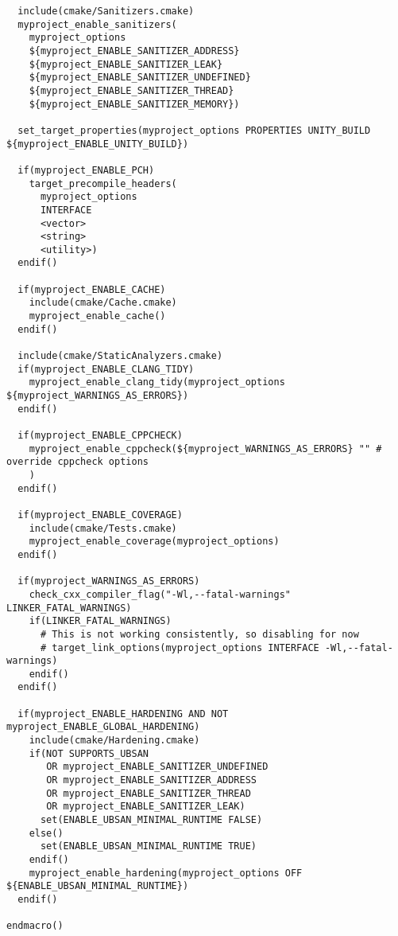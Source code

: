 \documentclass[openany]{report}
\begin{document}
\begin{verbatim}
  include(cmake/Sanitizers.cmake)
  myproject_enable_sanitizers(
    myproject_options
    ${myproject_ENABLE_SANITIZER_ADDRESS}
    ${myproject_ENABLE_SANITIZER_LEAK}
    ${myproject_ENABLE_SANITIZER_UNDEFINED}
    ${myproject_ENABLE_SANITIZER_THREAD}
    ${myproject_ENABLE_SANITIZER_MEMORY})

  set_target_properties(myproject_options PROPERTIES UNITY_BUILD ${myproject_ENABLE_UNITY_BUILD})

  if(myproject_ENABLE_PCH)
    target_precompile_headers(
      myproject_options
      INTERFACE
      <vector>
      <string>
      <utility>)
  endif()

  if(myproject_ENABLE_CACHE)
    include(cmake/Cache.cmake)
    myproject_enable_cache()
  endif()

  include(cmake/StaticAnalyzers.cmake)
  if(myproject_ENABLE_CLANG_TIDY)
    myproject_enable_clang_tidy(myproject_options ${myproject_WARNINGS_AS_ERRORS})
  endif()

  if(myproject_ENABLE_CPPCHECK)
    myproject_enable_cppcheck(${myproject_WARNINGS_AS_ERRORS} "" # override cppcheck options
    )
  endif()

  if(myproject_ENABLE_COVERAGE)
    include(cmake/Tests.cmake)
    myproject_enable_coverage(myproject_options)
  endif()

  if(myproject_WARNINGS_AS_ERRORS)
    check_cxx_compiler_flag("-Wl,--fatal-warnings" LINKER_FATAL_WARNINGS)
    if(LINKER_FATAL_WARNINGS)
      # This is not working consistently, so disabling for now
      # target_link_options(myproject_options INTERFACE -Wl,--fatal-warnings)
    endif()
  endif()

  if(myproject_ENABLE_HARDENING AND NOT myproject_ENABLE_GLOBAL_HARDENING)
    include(cmake/Hardening.cmake)
    if(NOT SUPPORTS_UBSAN 
       OR myproject_ENABLE_SANITIZER_UNDEFINED
       OR myproject_ENABLE_SANITIZER_ADDRESS
       OR myproject_ENABLE_SANITIZER_THREAD
       OR myproject_ENABLE_SANITIZER_LEAK)
      set(ENABLE_UBSAN_MINIMAL_RUNTIME FALSE)
    else()
      set(ENABLE_UBSAN_MINIMAL_RUNTIME TRUE)
    endif()
    myproject_enable_hardening(myproject_options OFF ${ENABLE_UBSAN_MINIMAL_RUNTIME})
  endif()

endmacro()
\end{verbatim}
\end{document}
